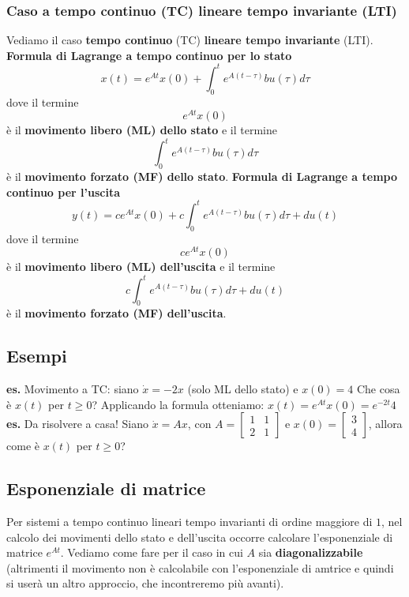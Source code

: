 \subsubsection{Caso a tempo continuo (TC) lineare tempo invariante (LTI)}
Vediamo il caso \textbf{tempo continuo} (TC) \textbf{lineare tempo invariante} (LTI).\newline
\textbf{Formula di Lagrange a tempo continuo per lo stato}
\[
    x(t) = e^{At}x(0) + \int_{0}^{t}e^{A(t-\tau)}bu(\tau)d \tau
\]
dove il termine
\[
    e^{At}x(0)
\] è il \textbf{movimento libero (ML) dello stato} e il termine
\[
    \int_{0}^{t}e^{A(t-\tau)}bu(\tau)d \tau
\] è il \textbf{movimento forzato (MF) dello stato}.\newline
\newline
\textbf{Formula di Lagrange a tempo continuo per l'uscita}
\[
    y(t) = c e^{At}x(0) + c\int_{0}^{t}e^{A(t-\tau)}bu(\tau)d \tau + du(t)
\]
dove il termine
\[
    ce^{At}x(0)
\]
è il \textbf{movimento libero (ML) dell'uscita} e il termine
\[
    c\int_{0}^{t}e^{A(t-\tau)}bu(\tau)d \tau + du(t)
\] 
è il \textbf{movimento forzato (MF) dell'uscita}.
\subsection{Esempi}
\textbf{es.} Movimento a TC:\newline
siano\newline
$\dot{x} = -2x$ (solo ML dello stato) e $x(0) = 4$\newline
Che cosa è $x(t)$ per $t\geq 0$?\newline
Applicando la formula otteniamo: $x(t) = e^{At}x(0) = e^{-2t}4$\newline
\newline
\textbf{es.} Da risolvere a casa!\newline
Siano $\dot{x} = Ax$, con $A = \left[\begin{matrix}
    1&1\\
    2&1
\end{matrix}\right]$ e $x(0) = \left[\begin{matrix}
    3\\
    4
\end{matrix}\right]$, allora come è $x(t)$ per $t\geq 0$?
\subsection{Esponenziale di matrice}
Per sistemi a tempo continuo lineari tempo invarianti di ordine maggiore di $1$, nel calcolo dei movimenti dello stato e dell'uscita occorre calcolare l'esponenziale di matrice $e^{At}$.\newline
\newline
Vediamo come fare per il caso in cui $A$ sia \textbf{diagonalizzabile} (altrimenti il movimento non è calcolabile con l'esponenziale di amtrice e quindi si userà un altro approccio, che incontreremo più avanti).
